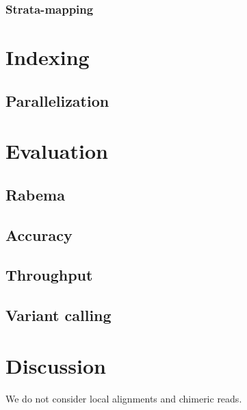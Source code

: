 \subsubsection{Strata-mapping}


\section{Indexing}
\subsection{Parallelization}


\section{Evaluation}
\subsection{Rabema}
\subsection{Accuracy}
\subsection{Throughput}
\subsection{Variant calling}



\section{Discussion}

We do not consider local alignments and chimeric reads.
